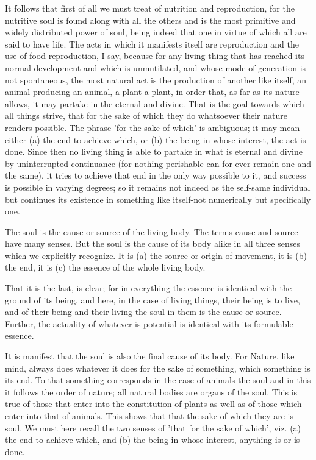 It follows that first of all we must treat of nutrition and reproduction,
for the nutritive soul is found along with all the others and is the
most primitive and widely distributed power of soul, being indeed
that one in virtue of which all are said to have life. The acts in
which it manifests itself are reproduction and the use of food-reproduction,
I say, because for any living thing that has reached its normal development
and which is unmutilated, and whose mode of generation is not spontaneous,
the most natural act is the production of another like itself, an
animal producing an animal, a plant a plant, in order that, as far
as its nature allows, it may partake in the eternal and divine. That
is the goal towards which all things strive, that for the sake of
which they do whatsoever their nature renders possible. The phrase
'for the sake of which' is ambiguous; it may mean either (a) the end
to achieve which, or (b) the being in whose interest, the act is done.
Since then no living thing is able to partake in what is eternal and
divine by uninterrupted continuance (for nothing perishable can for
ever remain one and the same), it tries to achieve that end in the
only way possible to it, and success is possible in varying degrees;
so it remains not indeed as the self-same individual but continues
its existence in something like itself-not numerically but specifically
one. 

The soul is the cause or source of the living body. The terms cause
and source have many senses. But the soul is the cause of its body
alike in all three senses which we explicitly recognize. It is (a)
the source or origin of movement, it is (b) the end, it is (c) the
essence of the whole living body. 

That it is the last, is clear; for in everything the essence is identical
with the ground of its being, and here, in the case of living things,
their being is to live, and of their being and their living the soul
in them is the cause or source. Further, the actuality of whatever
is potential is identical with its formulable essence. 

It is manifest that the soul is also the final cause of its body.
For Nature, like mind, always does whatever it does for the sake of
something, which something is its end. To that something corresponds
in the case of animals the soul and in this it follows the order of
nature; all natural bodies are organs of the soul. This is true of
those that enter into the constitution of plants as well as of those
which enter into that of animals. This shows that that the sake of
which they are is soul. We must here recall the two senses of 'that
for the sake of which', viz. (a) the end to achieve which, and (b)
the being in whose interest, anything is or is done. 


